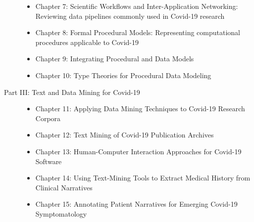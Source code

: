 \documentclass{statsoc}
\begin{document}
\begin{description}
\begin{itemize}
\item Chapter 7: \hspace{3pt} Scientific Workflows and Inter-Application Networking: Reviewing data pipelines commonly used in Covid-19 research

\item Chapter 8: \hspace{0.5pt} Formal Procedural Models: Representing computational procedures applicable to Covid-19

\item Chapter 9: \hspace{2pt} Integrating Procedural and Data Models

\item Chapter 10: Type Theories for Procedural Data Modeling

\end{itemize}

\item[Part III: Text and Data Mining for Covid-19]

\begin{itemize}

\item Chapter 11: Applying Data Mining Techniques to Covid-19 Research Corpora

\item Chapter 12: Text Mining of Covid-19 Publication Archives

\item Chapter 13: Human-Computer Interaction Approaches for Covid-19 Software 

\item Chapter 14: Using Text-Mining Tools to Extract Medical History from Clinical Narratives 

\item Chapter 15: Annotating Patient Narratives for Emerging 
Covid-19 Symptomatology 


\end{itemize}

\end{description}
\end{document}
